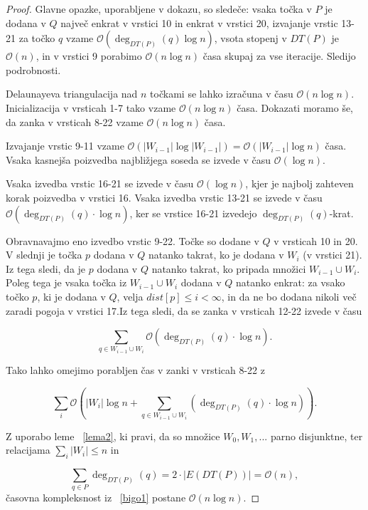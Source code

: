 \documentclass[a4paper, 12pt]{book}
\newcommand{\OO}{\ensuremath{\mathcal{O}}} %
\begin{document}
\begin{proof}
Glavne opazke, uporabljene v dokazu, so sledeče: vsaka točka v $P$ je dodana v $Q$ največ enkrat v vrstici 10 in enkrat v vrstici 20, izvajanje vrstic 13-21 za točko $q$ vzame $\OO(\deg_{DT(P)}(q)\log n)$, vsota stopenj v $DT(P)$ je $\OO(n)$, in v vrstici 9 porabimo $\OO(n\log n)$ časa skupaj za vse iteracije. Sledijo podrobnosti.

Delaunayeva triangulacija nad $n$ točkami se lahko izračuna v času $\OO(n\log n)$. Inicializacija v vrsticah 1-7 tako vzame $\OO(n\log n)$ časa. Dokazati moramo še, da zanka v vrsticah 8-22 vzame $\OO(n\log n)$ časa.

Izvajanje vrstic 9-11 vzame $\OO(|W_{i-1}|\log |W_{i-1}|) = \OO(|W_{i-1}|\log n)$ časa. Vsaka kasnejša poizvedba najbližjega soseda se izvede v času $\OO(\log n)$.

Vsaka izvedba vrstic 16-21 se izvede v času $\OO(\log n)$, kjer je najbolj zahteven korak poizvedba v vrstici 16. Vsaka izvedba vrstic 13-21 se izvede v času $\OO(\deg_{DT(P)}(q)\cdot\log n)$, ker se vrstice 16-21 izvedejo $\deg_{DT(P)}(q)$-krat.

Obravnavajmo eno izvedbo vrstic 9-22. Točke so dodane v $Q$ v vrsticah 10 in 20. V slednji je točka $p$ dodana v $Q$ natanko takrat, ko je dodana v $W_i$ (v vrstici 21). Iz tega sledi, da je $p$ dodana v $Q$ natanko takrat, ko pripada množici $W_{i-1}\cup W_i$. Poleg tega je vsaka točka iz $W_{i-1}\cup W_i$ dodana v $Q$ natanko enkrat: za vsako točko $p$, ki je dodana v $Q$, velja $dist[p]\leq i < \infty$, in da ne bo dodana nikoli več zaradi pogoja v vrstici 17.Iz tega sledi, da se zanka v vrsticah 12-22 izvede v času

\begin{equation}
\sum_{q\in W_{i-1}\cup W_i} \OO(\deg_{DT(P)}(q) \cdot \log n).
\end{equation}

Tako lahko omejimo porabljen čas v zanki v vrsticah 8-22 z

\begin{equation}
\label{bigo1}
\sum_i \OO \left( |W_i|\log n + \sum_{q\in W_{i-1}\cup W_i} (\deg_{DT(P)}(q) \cdot \log n) \right) .
\end{equation}

Z uporabo leme ~\ref{lema2}, ki pravi, da so množice $W_0,W_1,...$ parno disjunktne, ter relacijama $\sum_i |W_i| \leq n$ in 

\begin{equation}
\sum_{q \in P} \deg_{DT(P)}(q) = 2 \cdot |E(DT(P))| = \OO(n),
\end{equation}
časovna kompleksnost iz ~\ref{bigo1} postane $\OO(n\log n)$.
\end{proof}
\end{document}
